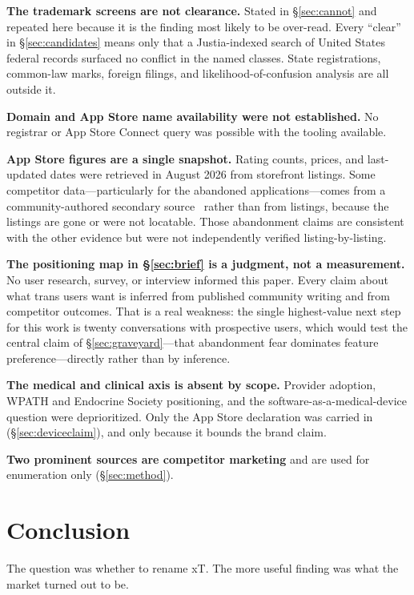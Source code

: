 \documentclass[11pt,a4paper]{article}
\begin{document}
\textbf{The trademark screens are not clearance.} Stated in
\S\ref{sec:cannot} and repeated here because it is the finding most
likely to be over-read. Every ``clear'' in \S\ref{sec:candidates}
means only that a Justia-indexed search of United States federal
records surfaced no conflict in the named classes. State registrations,
common-law marks, foreign filings, and likelihood-of-confusion analysis
are all outside it.

\textbf{Domain and App Store name availability were not established.}
No registrar or App Store Connect query was possible with the tooling
available.

\textbf{App Store figures are a single snapshot.} Rating counts,
prices, and last-updated dates were retrieved in August 2026 from
storefront listings. Some competitor data---particularly for the
abandoned applications---comes from a community-authored secondary
source~\cite{transsolidarity} rather than from listings, because the
listings are gone or were not locatable. Those abandonment claims are
consistent with the other evidence but were not independently verified
listing-by-listing.

\textbf{The positioning map in \S\ref{sec:brief} is a judgment, not a
measurement.} No user research, survey, or interview informed this
paper. Every claim about what trans users want is inferred from
published community writing and from competitor outcomes. That is a
real weakness: the single highest-value next step for this work is
twenty conversations with prospective users, which would test the
central claim of \S\ref{sec:graveyard}---that abandonment fear
dominates feature preference---directly rather than by inference.

\textbf{The medical and clinical axis is absent by scope.} Provider
adoption, WPATH and Endocrine Society positioning, and the
software-as-a-medical-device question were deprioritized. Only the
App Store declaration was carried in (\S\ref{sec:deviceclaim}), and
only because it bounds the brand claim.

\textbf{Two prominent sources are competitor marketing} and are used
for enumeration only (\S\ref{sec:method}).

\section{Conclusion}

The question was whether to rename xT. The more useful finding was what
the market turned out to be.
\end{document}
